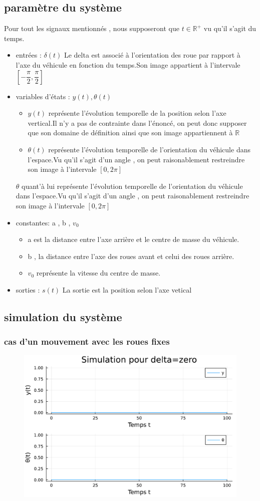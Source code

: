 \documentclass[11pt,a4paper]{article}
\begin{document}
\subsection{paramètre du système}
Pour tout les signaux mentionnés , nous supposeront que $t \in \mathbb{R}^+$ vu qu'il s'agit du temps.
\begin{itemize}
	\item entrées : $\delta(t)$
	      Le delta est associé à l'orientation des roue par rapport à l'axe du véhicule en fonction du temps.Son image appartient à l'intervale $[-\dfrac{\pi}{2},\dfrac{\pi}{2}]$
	\item variables d'états : $y(t),\theta(t)$
    \begin{itemize}
      \item $y(t)$ représente l'évolution temporelle de la position selon l'axe vertical.Il n'y a pas de contrainte dans l'énoncé, on peut donc supposer que son domaine de définition ainsi que son image appartiennent à $\mathbb{R}$
      \item $\theta(t)$ représente l'évolution temporelle de l'orientation du véhicule dans l'espace.Vu qu'il s'agit d'un angle , on peut raisonablement restreindre son image à l'intervale $ [ 0 , 2\pi]$
    \end{itemize}
	      $\theta$ quant'à lui représente l'évolution temporelle de l'orientation du véhicule dans l'espace.Vu qu'il s'agit d'un angle , on peut raisonablement restreindre son image à l'intervale $[ 0,2\pi]$
	\item constantes: a , b , $v_0$ \begin{itemize}
	 \item 
    a est la distance entre l'axe arrière et le centre de masse du véhicule. 
    \item b , la distance entre l'axe des roues avant et celui des roues arrière.
    \item $v_0$ représente la vitesse du centre de masse.

	\end{itemize}
	\item sorties : $s(t)$
	      La sortie est la position selon l'axe vetical
\end{itemize}
\subsection{simulation du système}
\subsubsection{cas d'un mouvement avec les roues fixes}
\begin{figure}[!h]
	\centering
	\includegraphics[width=0.5\linewidth]{jlplots/Q1_3_zero.pdf}
\end{figure}
\newpage
\end{document}
